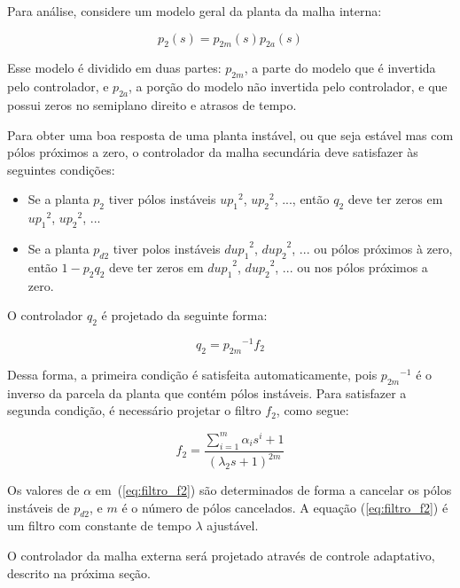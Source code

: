     Para análise, considere um modelo geral da planta da malha interna:

    \begin{equation}
        p_2(s) = p_{2m}(s) p_{2a}(s)
    \end{equation}

    Esse modelo é dividido em duas partes: $p_{2m}$, a parte do modelo que é invertida
    pelo controlador, e $p_{2a}$, a porção do modelo não invertida pelo controlador,
    e que possui zeros no semiplano direito e atrasos de tempo.

    Para obter uma boa resposta de uma planta instável, ou que seja estável mas com
    pólos próximos a zero, o controlador da malha secundária deve satisfazer às
    seguintes condições:

    \begin{itemize}
        \item Se a planta $p_2$ tiver pólos instáveis ${up_1}^2$, ${up_2}^2$, ...,
        então $q_2$ deve ter zeros em ${up_1}^2$, ${up_2}^2$, ...
        \item Se a planta $p_{d2}$ tiver polos instáveis ${dup_1}^2$, ${dup_2}^2$,
        ... ou pólos próximos à zero, então $1 - p_2 q_2$ deve ter zeros em
        ${dup_1}^2$, ${dup_2}^2$, ... ou nos pólos próximos a zero.
    \end{itemize}

    O controlador $q_2$ é projetado da seguinte forma:

    \begin{equation}
        q_2 = {p_{2m}}^{-1} f_2
    \end{equation}

    Dessa forma, a primeira condição é satisfeita automaticamente, pois ${p_{2m}}^{-1}$
    é o inverso da parcela da planta que contém pólos instáveis. Para satisfazer
    a segunda condição, é necessário projetar o filtro $f_2$, como segue:

    \begin{equation}
        f_2 = \frac{\sum_{i=1}^{m} \alpha_i s^i + 1}{(\lambda_2 s + 1)^{2m}}
        \label{eq:filtro_f2}
    \end{equation}

    Os valores de $\alpha$ em~(\ref{eq:filtro_f2}) são determinados de forma a
    cancelar os pólos instáveis de $p_{d2}$, e $m$ é o número de pólos cancelados.
    A equação (\ref{eq:filtro_f2}) é um filtro com constante de tempo $\lambda$
    ajustável.

    O controlador da malha externa será projetado através de controle adaptativo,
    descrito na próxima seção.



